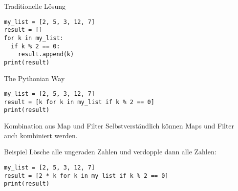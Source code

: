 \begin{fragile}
\begin{overprint}

\begin{block}{Traditionelle Lösung}
\vspace{2pt}
\begin{verbatim}
my_list = [2, 5, 3, 12, 7]
result = []
for k in my_list: 
  if k % 2 == 0: 
    result.append(k)
print(result)
\end{verbatim}
\end{block}

\vspace{12pt}

\pause

\begin{block}{The Pythonian Way}
\vspace{2pt}
\begin{verbatim}
my_list = [2, 5, 3, 12, 7]
result = [k for k in my_list if k % 2 == 0]
print(result)
\end{verbatim}
\end{block}
\end{overprint}


\end{fragile}

\begin{fragile}
\begin{block}{Kombination aus Map und Filter}
\vspace{2pt}
Selbstverständlich können Maps und Filter auch kombiniert werden. 
\end{block}

\vspace{12pt}

\begin{exampleblock}{Beispiel}
\vspace{2pt}
Lösche alle ungeraden Zahlen und verdopple dann alle Zahlen: 

\begin{verbatim}
my_list = [2, 5, 3, 12, 7]
result = [2 * k for k in my_list if k % 2 == 0]
print(result)
\end{verbatim}
\end{exampleblock}

\end{fragile}


